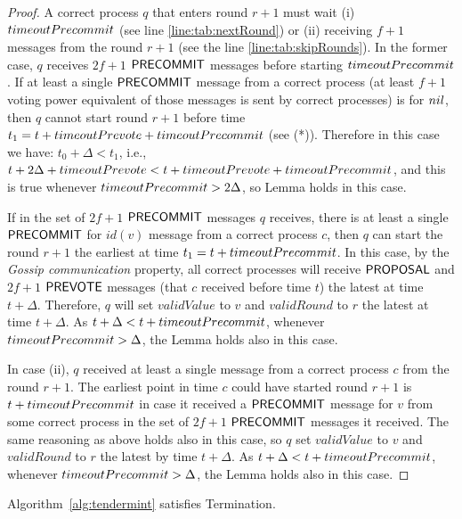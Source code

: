 \begin{proof}
A correct process $q$ that enters round $r+1$ must wait (i) $timeoutPrecommit$
(see line \ref{line:tab:nextRound}) or (ii) receiving $f+1$ messages from the
round $r+1$ (see the line \ref{line:tab:skipRounds}).  In the former case, $q$
receives $2f+1$ $\mathsf{PRECOMMIT}$ messages before starting $timeoutPrecommit$. If
at least a single $\mathsf{PRECOMMIT}$ message from a correct process (at least $f+1$
voting power equivalent of those messages is sent by correct processes) is for
$nil$, then $q$ cannot start round $r+1$ before time $t_1 = t +
timeoutPrevote + timeoutPrecommit$ (see (*)). Therefore in this case we have:
$t_0 + \Delta < t_1$, i.e., $t+2\Delta+timeoutPrevote <  t + timeoutPrevote +
timeoutPrecommit$, and this is true whenever $timeoutPrecommit > 2\Delta$, so
Lemma holds in this case. 

If in the set of $2f+1$ $\mathsf{PRECOMMIT}$ messages $q$ receives, there is at least a
single $\mathsf{PRECOMMIT}$ for $id(v)$ message from a correct process $c$, then $q$
can start the round $r+1$ the earliest at time $t_1 = t+timeoutPrecommit$. In
this case, by the \emph{Gossip communication} property, all correct processes
will receive $\mathsf{PROPOSAL}$ and $2f+1$ $\mathsf{PREVOTE}$ messages (that $c$ received
before time $t$) the latest at time $t+\Delta$. Therefore, $q$ will set
$validValue$ to $v$ and $validRound$ to $r$ the latest at time $t+\Delta$. As
$t+\Delta < t+timeoutPrecommit$, whenever $timeoutPrecommit > \Delta$, the
Lemma holds also in this case.    

In case (ii), $q$ received at least a single message from a correct process $c$
from the round $r+1$. The earliest point in time $c$ could have started round
$r+1$ is $t+timeoutPrecommit$ in case it received a $\mathsf{PRECOMMIT}$ message for
$v$ from some correct process in the set of $2f+1$ $\mathsf{PRECOMMIT}$ messages it
received. The same reasoning as above holds also in this case, so $q$ set
$validValue$ to $v$ and $validRound$ to $r$ the latest by time $t+\Delta$. As
$t+\Delta < t+timeoutPrecommit$, whenever $timeoutPrecommit > \Delta$, the
Lemma holds also in this case.    \end{proof}

\begin{lemma} \label{lemma:agreement} Algorithm~\ref{alg:tendermint} satisfies
Termination.  \end{lemma}

